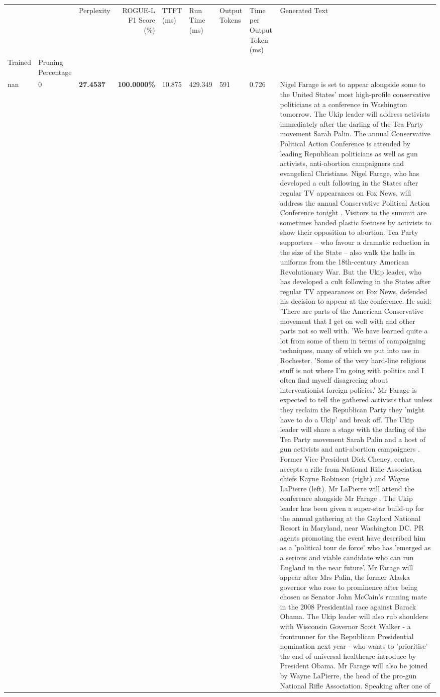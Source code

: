 \begin{table}[H]
\label{tab:evaluation-pipeline-4}
\begin{tabular}{lllrlllll}
\toprule
 &  & Perplexity & ROGUE-L F1 Score (\%) & TTFT (ms) & Run Time (ms) & Output Tokens & Time per Output Token (ms) & Generated Text \\
Trained & Pruning Percentage &  &  &  &  &  &  &  \\
\midrule
nan & 0 & \bfseries 27.4537 & \bfseries 100.0000\% & 10.875 & 429.349 & 591 & 0.726 & Nigel Farage is set to appear alongside some to the United States' most high-profile conservative politicians at a conference in Washington tomorrow. The Ukip leader will address activists immediately after the darling of the Tea Party movement Sarah Palin. The annual Conservative Political Action Conference is attended by leading Republican politicians as well as gun activists, anti-abortion campaigners and evangelical Christians. Nigel Farage, who has developed a cult following in the States after regular TV appearances on Fox News, will address the annual Conservative Political Action Conference tonight . Visitors to the summit are sometimes handed plastic foetuses by activists to show their opposition to abortion. Tea Party supporters – who favour a dramatic reduction in the size of the State – also walk the halls in uniforms from the 18th-century American Revolutionary War. But the Ukip leader, who has developed a cult following in the States after regular TV appearances on Fox News, defended his decision to appear at the conference. He said: 'There are parts of the American Conservative movement that I get on well with and other parts not so well with. 'We have learned quite a lot from some of them in terms of campaigning techniques, many of which we put into use in Rochester. 'Some of the very hard-line religious stuff is not where I'm going with politics and I often find myself disagreeing about interventionist foreign policies.' Mr Farage is expected to tell the gathered activists that unless they reclaim the Republican Party they 'might have to do a Ukip' and break off. The Ukip leader will share a stage with the darling of the Tea Party movement Sarah Palin and a host of gun activists and anti-abortion campaigners . Former Vice President Dick Cheney, centre, accepts a rifle from National Rifle Association chiefs Kayne Robinson (right) and Wayne LaPierre (left). Mr LaPierre will attend the conference alongside Mr Farage . The Ukip leader has been given a super-star build-up for the annual gathering at the Gaylord National Resort in Maryland, near Washington DC. PR agents promoting the event have described him as a 'political tour de force' who has 'emerged as a serious and viable candidate who can run England in the near future'. Mr Farage will appear after Mrs Palin, the former Alaska governor who rose to prominence after being chosen as Senator John McCain's running mate in the 2008 Presidential race against Barack Obama. The Ukip leader will also rub shoulders with Wisconsin Governor Scott Walker - a frontrunner for the Republican Presidential nomination next year - who wants to 'prioritise' the end of universal healthcare introduce by President Obama. Mr Farage will also be joined by Wayne LaPierre, the head of the pro-gun National Rifle Association. Speaking after one of 
\end{tabular}
\end{table}
